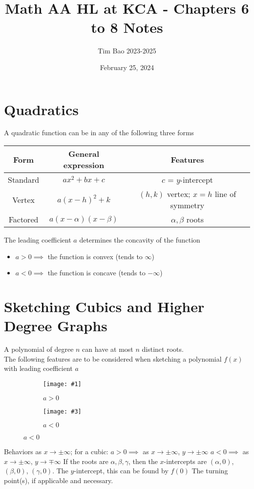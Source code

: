 \documentclass[11pt]{article}
\title{Math AA HL at KCA - Chapters 6 to 8 Notes}
\author{Tim Bao 2023-2025}
\date{February 25, 2024}
\newcommand{\lb}{\\[8pt]}
\newcommand{\doubleimg}[4]{\begin{center}
  \begin{figure}[H]
    \centering
    \begin{subfigure}{.45\textwidth}
      \centering
      \texttt{[image: \#1]}
      \caption{#2}
      \label{fig:sub1}
    \end{subfigure}
    \begin{subfigure}{.45\textwidth}
      \centering
      \texttt{[image: \#3]}
      \caption{#4}
      \label{fig:sub2}
    \end{subfigure}
  \end{figure}
\end{center}}
\begin{document}
\maketitle
\pagebreak
\tableofcontents
\pagebreak

\section{Quadratics}

A quadratic function can be in any of the following three forms

\begin{center}
  \begin{tabular}{c|c|c}
    Form     & General expression         & Features                                  \\ \hline
    Standard & $ax^2 + bx + c$            & $c$ = $y$-intercept                       \\
    Vertex   & $a(x - h)^2 + k$           & $(h, k)$ vertex; $x = h$ line of symmetry \\
    Factored & $a(x - \alpha)(x - \beta)$ & $\alpha, \beta$ roots                     \\
  \end{tabular}
\end{center}

\noindent The leading coefficient $a$ determines the concavity of the function
\begin{itemize}
  \item $a > 0 \implies$ the function is convex (tends to $\infty$)
  \item $a < 0 \implies$ the function is concave (tends to $-\infty$)
\end{itemize}

\pagebreak

\section{Sketching Cubics and Higher Degree Graphs}

A polynomial of degree $n$ can have at most $n$ distinct roots. \lb
The following features are to be considered when sketching a polynomial $f(x)$ with leading coefficient $a$

\doubleimg{figs/cubic1.png}{$a > 0$}{figs/cubic2.png}{$a < 0$}

\begin{outline}[enumerate]
  \1 Behaviors as $x\to \pm\infty$; for a cubic:
  \2 $a > 0 \implies$ as $x\to\pm\infty$, $y\to\pm\infty$
  \2 $a < 0 \implies$ as $x\to\pm\infty$, $y\to\mp\infty$
  \1 If the roots are $\alpha, \beta, \gamma$, then the $x$-intercepts are $(\alpha, 0)$, $(\beta, 0)$, $(\gamma, 0)$.
  \1 The $y$-intercept, this can be found by $f(0)$
  \1 The turning point(s), if applicable and necessary.
\end{outline}
\end{document}
